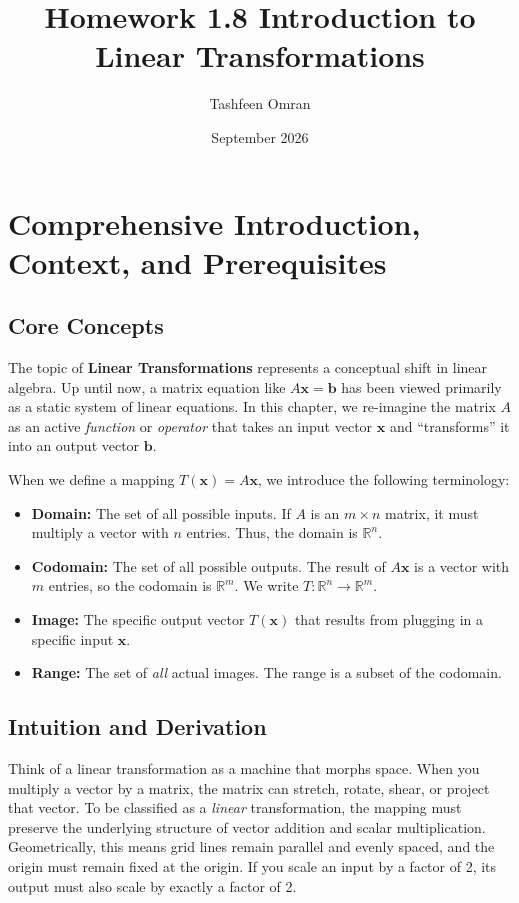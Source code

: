 \documentclass[11pt]{article}
\title{Homework 1.8 Introduction to Linear Transformations}
\author{Tashfeen Omran}
\date{September 2026}
\begin{document}
\maketitle
\tableofcontents
\newpage

\section{Comprehensive Introduction, Context, and Prerequisites}

\subsection{Core Concepts}
The topic of \textbf{Linear Transformations} represents a conceptual shift in linear algebra. Up until now, a matrix equation like $A\mathbf{x} = \mathbf{b}$ has been viewed primarily as a static system of linear equations. In this chapter, we re-imagine the matrix $A$ as an active \textit{function} or \textit{operator} that takes an input vector $\mathbf{x}$ and ``transforms'' it into an output vector $\mathbf{b}$. 

When we define a mapping $T(\mathbf{x}) = A\mathbf{x}$, we introduce the following terminology:
\begin{itemize}
    \item \textbf{Domain:} The set of all possible inputs. If $A$ is an $m \times n$ matrix, it must multiply a vector with $n$ entries. Thus, the domain is $\mathbb{R}^n$.
    \item \textbf{Codomain:} The set of all possible outputs. The result of $A\mathbf{x}$ is a vector with $m$ entries, so the codomain is $\mathbb{R}^m$. We write $T: \mathbb{R}^n \to \mathbb{R}^m$.
    \item \textbf{Image:} The specific output vector $T(\mathbf{x})$ that results from plugging in a specific input $\mathbf{x}$.
    \item \textbf{Range:} The set of \textit{all} actual images. The range is a subset of the codomain.
\end{itemize}

\subsection{Intuition and Derivation}
Think of a linear transformation as a machine that morphs space. When you multiply a vector by a matrix, the matrix can stretch, rotate, shear, or project that vector. 
To be classified as a \textit{linear} transformation, the mapping must preserve the underlying structure of vector addition and scalar multiplication. Geometrically, this means grid lines remain parallel and evenly spaced, and the origin must remain fixed at the origin. If you scale an input by a factor of 2, its output must also scale by exactly a factor of 2. 
\end{document}
